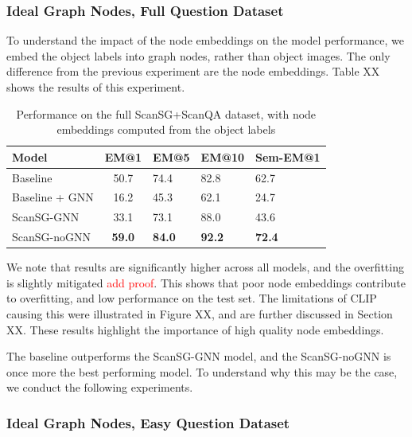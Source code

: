 \subsubsection{Ideal Graph Nodes, Full Question Dataset}
To understand the impact of the node embeddings on the model performance, we embed the object labels into graph nodes, rather than object images. The only difference from the previous experiment are the node embeddings. Table XX shows the results of this experiment.

\begin{table}[h!]
    \centering
    \caption{Performance on the full ScanSG+ScanQA dataset, with node embeddings computed from the object labels}
    \begin{tabular}{|l|c|l|l|l|}
    \hline
    \textbf{Model}         & \textbf{EM@1} & \textbf{EM@5} & \textbf{EM@10}  & \textbf{Sem-EM@1} \\ \hline
    Baseline               & 50.7 & 74.4 & 82.8 & 62.7 \\ \hline
    Baseline + GNN         & 16.2 & 45.3 & 62.1 & 24.7 \\ \hline
    ScanSG-GNN             & 33.1 & 73.1 & 88.0 & 43.6 \\ \hline
    ScanSG-noGNN           & \textbf{59.0} & \textbf{84.0} & \textbf{92.2} & \textbf{72.4} \\ \hline
    \end{tabular}
\end{table}

We note that results are significantly higher across all models, and the overfitting is slightly mitigated \textcolor{red}{add proof}. This shows that poor node embeddings contribute to overfitting, and low performance on the test set. The limitations of CLIP causing this were illustrated in Figure XX, and are further discussed in Section XX.
These results highlight the importance of high quality node embeddings.

The baseline outperforms the ScanSG-GNN model, and the ScanSG-noGNN is once more the best performing model.
To understand why this may be the case, we conduct the following experiments.

\subsubsection{Ideal Graph Nodes, Easy Question Dataset}

